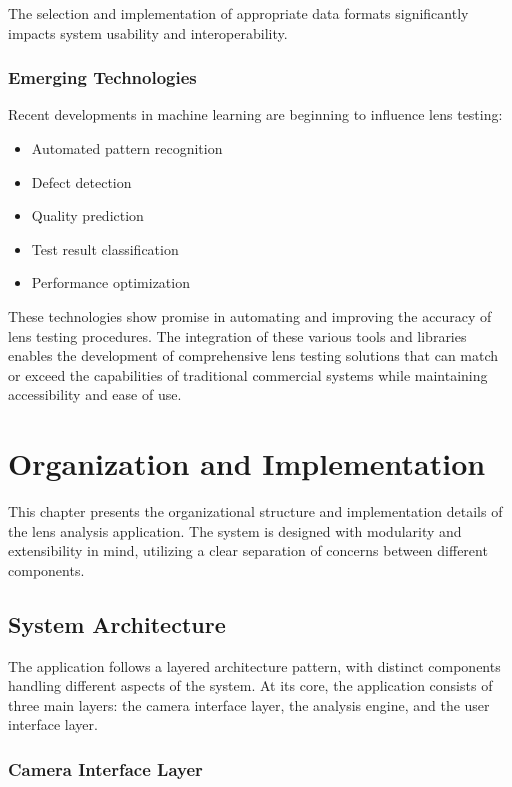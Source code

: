 The selection and implementation of appropriate data formats significantly impacts system usability and interoperability.

\subsection{Emerging Technologies}
Recent developments in machine learning are beginning to influence lens testing:
\begin{itemize}
    \item Automated pattern recognition
    \item Defect detection
    \item Quality prediction
    \item Test result classification
    \item Performance optimization
\end{itemize}

These technologies show promise in automating and improving the accuracy of lens testing procedures. The integration of these various tools and libraries enables the development of comprehensive lens testing solutions that can match or exceed the capabilities of traditional commercial systems while maintaining accessibility and ease of use.

\chapter{Organization and Implementation}

This chapter presents the organizational structure and implementation details of the lens analysis application. The system is designed with modularity and extensibility in mind, utilizing a clear separation of concerns between different components.

\section{System Architecture}

The application follows a layered architecture pattern, with distinct components handling different aspects of the system. At its core, the application consists of three main layers: the camera interface layer, the analysis engine, and the user interface layer.

\subsection{Camera Interface Layer}

